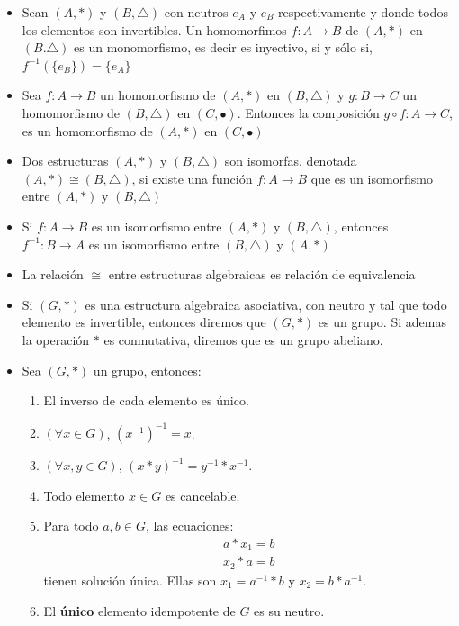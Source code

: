 \documentclass[letterpaper,10pt]{article}
\theoremstyle{plain}
\begin{document}
\begin{framed}
\begin{multicols}{2}
\begin{itemize}
            \item Sean $(A,*)$ y $(B,\triangle)$ con neutros $e_A$ y $e_B$ respectivamente y donde todos los elementos son invertibles. Un homomorfimos $f:A\to B$ de $(A,*)$ en $(B.\triangle)$ es un monomorfismo, es decir es inyectivo, si y sólo si, $f^{-1}(\{e_B\})=\{e_A\}$
            \item Sea $f:A\to B$ un homomorfismo de $(A,*)$ en $(B,\triangle)$ y $g:B \to C$ un homomorfismo de $(B,\triangle)$ en $(C,\bullet)$. Entonces la composición $g\circ f:A \to C$, es un homomorfismo de $(A,*)$ en $(C,\bullet)$
            \item Dos estructuras  $(A,*)$ y $(B,\triangle)$ son isomorfas, denotada  $(A,*) \cong (B,\triangle)$, si existe una función $f:A\to B$ que es un isomorfismo entre  $(A,*)$ y $(B,\triangle)$
            \item Si $f:A\to B$ es un isomorfismo entre $(A,*)$ y $(B,\triangle)$, entonces $f^{-1}:B\to A$ es un isomorfismo entre $(B,\triangle)$ y $(A,*)$
            \item La relación $\cong$ entre estructuras algebraicas es relación de equivalencia
	        \item Si $(G,*)$ es una estructura algebraica asociativa, con neutro y tal que todo elemento es invertible, entonces diremos que $(G,*)$ es un grupo. Si ademas la operación $*$ es conmutativa, diremos que es un grupo abeliano.
            \item Sea $(G,*)$ un grupo, entonces:
                \begin{enumerate}
                	\item El inverso de cada elemento es único.
                	\item $(\forall x \in G)$, $(x^{-1})^{-1}=x$.
                	\item $(\forall x,y \in G)$, $(x*y)^{-1}=y^{-1}*x^{-1}$.
                	\item Todo elemento $x \in G$ es cancelable.
                	\item Para todo $a,b \in G$, las ecuaciones:
                	$$
                	\begin{array}{c}
                	a*x_1=b \\x_2*a=b
                	\end{array}
                	$$ 
                	tienen solución única. Ellas son $x_1=a^{-1}*b$ y $x_2=b*a^{-1}$.
                	\item El \textbf{único} elemento idempotente de $G$ es su neutro.
                \end{enumerate}
            
	    \end{itemize}
	\end{multicols}
\end{framed}
\end{document}
